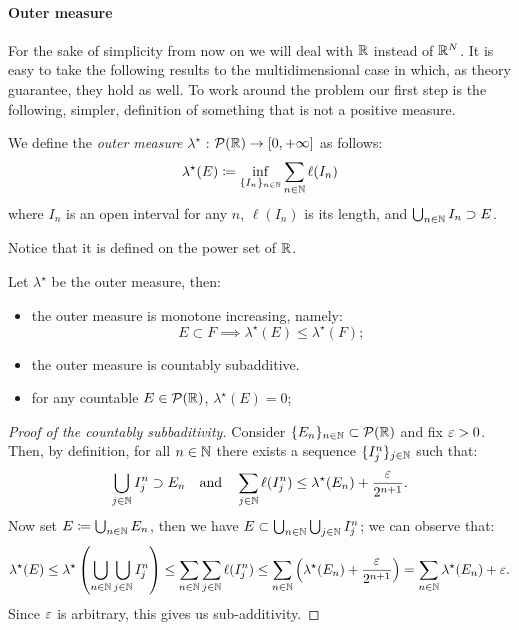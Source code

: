 \paragraph{Outer measure} For the sake of simplicity from now on we will deal with $\mathbb R$ instead of $\mathbb R^N$. It is easy to take the following results to the multidimensional case in which, as theory guarantee, they hold as well. To work around the problem our first step is the following, simpler, definition of something that is not a positive measure. 

\begin{defn}
	We define the \emph{outer measure} $\lambda^\star$ : $\mathcal P(\mathbb R) \to [0,+\infty]$ as follows:
	$$
		\lambda^\star(E) 
		\coloneqq \inf_{\{I_n\}_{n\in \mathbb N}} \sum_{n \in \mathbb N} \ell(I_n)
	$$
	where $I_n$ is an open interval for any $n$, $\ell(I_n)$ is its length, and $\bigcup_{n \in \mathbb N} I_n \supset E$.
\end{defn}
Notice that it is defined on the power set of $\mathbb R$.

\begin{prop}
	Let $\lambda^\star$ be the outer measure, then:
	\begin{itemize}
		\item the outer measure is monotone increasing, namely:
			$$
				E\subset F \implies \lambda^\star(E)\leq\lambda^\star(F)
			;
			$$
		\item the outer measure is countably subadditive. \label{outer-measure-c-subadd}
		\item for any countable $E \in \mathcal P(\mathbb R)$, $\lambda^\star(E)=0$;
	\end{itemize} 
\end{prop}

\begin{proof}[Proof of the countably subbaditivity]
	Consider $\{E_n\}_{n \in \mathbb N} \subset \mathcal P(\mathbb R)$ and fix $\varepsilon>0$. 
	Then, by definition, for all $n \in \mathbb N$ there exists a sequence $\{I_j^n\}_{j \in \mathbb N}$ such that:
	$$
		\bigcup_{j \in \mathbb N}I_j^n \supset E_n
		\quad \text{and} \quad
		\sum_{j \in \mathbb N}\ell(I_j^n)\leq\lambda^\star(E_n)+\frac{\varepsilon}{2^{n+1}}
	.
	$$
	Now set $E \coloneqq \bigcup_{n \in \mathbb N}E_n$, then we have $E \subset \bigcup_{n \in \mathbb N}\bigcup_{j \in \mathbb N}I_j^n$; we can observe that:
	$$
		\lambda^\star(E)
		\leq\lambda^\star\left( \bigcup_{n \in \mathbb N}\bigcup_{j \in \mathbb N}I_j^n \right)  
		\leq\sum_{n \in \mathbb N}\sum_{j \in \mathbb N}\ell(I_j^n)
		\leq\sum_{n \in \mathbb N}\left( \lambda^\star(E_n)+\frac{\varepsilon}{2^{n+1}} \right)  
		=\sum_{n \in \mathbb N}\lambda^\star(E_n)+\varepsilon
	.
	$$
	Since $\varepsilon$ is arbitrary, this gives us sub-additivity.
\end{proof}

